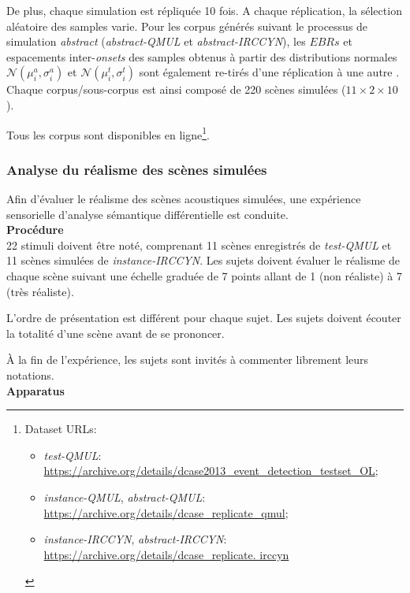 De plus, chaque simulation est répliquée 10 fois. A chaque réplication, la sélection aléatoire des samples varie. Pour les corpus générés suivant le processus de simulation \emph{abstract} (\emph{abstract-QMUL} et \emph{abstract-IRCCYN}), les $EBRs$ et espacements inter-\emph{onsets} des samples obtenus à partir des distributions normales  $\mathcal{N}(\mu_i^a,\sigma_i^a)$ et $\mathcal{N}(\mu_i^t,\sigma_i^t)$ sont également re-tirés d'une réplication à une autre . Chaque corpus/sous-corpus est ainsi composé de 220 scènes simulées ($11\times2\times10$).

Tous les corpus sont disponibles en ligne\footnote{Dataset URLs: \begin{itemize}
\item \emph{test-QMUL}: \url{https://archive.org/details/dcase2013_event_detection_testset_OL};
\item \emph{instance-QMUL}, \emph{abstract-QMUL}: \url{https://archive.org/details/dcase_replicate_qmul};
\item \emph{instance-IRCCYN}, \emph{abstract-IRCCYN}: \url{https://archive.org/details/dcase_replicate.
irccyn}
\end{itemize}}.

\subsubsection{Analyse du réalisme des scènes simulées}

Afin d'évaluer le réalisme des scènes acoustiques simulées, une expérience sensorielle d'analyse sémantique différentielle est conduite. \\

\textbf{Procédure} \\

22 stimuli doivent être noté, comprenant 11 scènes enregistrés de \emph{test-QMUL} et 11 scènes simulées de \emph{instance-IRCCYN}. Les sujets doivent évaluer le réalisme de chaque scène suivant une échelle graduée de 7 points allant de 1 (non réaliste) à 7 (très réaliste). 

L'ordre de présentation est différent pour chaque sujet. Les sujets doivent écouter la totalité d'une scène avant de se prononcer.

À la fin de l'expérience, les sujets sont invités à commenter librement leurs notations. \\

\textbf{Apparatus} \\

